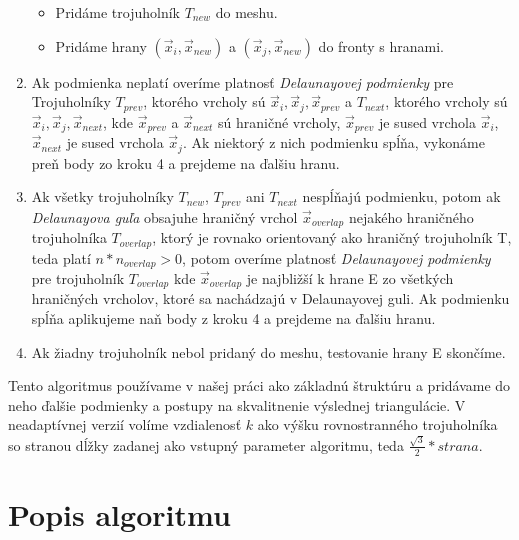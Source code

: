 \begin{enumerate}
{\begin{itemize}
        \item{Pridáme trojuholník $T_{new}$ do meshu.}
        \item{Pridáme hrany $(\overrightarrow{x}_i, \overrightarrow{x}_{new})$ a 
        $(\overrightarrow{x}_j, \overrightarrow{x}_{new})$ do fronty s hranami.}
    \end{itemize}
    }
    \item{
        Ak podmienka neplatí overíme platnosť \textit{Delaunayovej podmienky} pre Trojuholníky 
        $T_{prev}$, ktorého vrcholy sú $\overrightarrow{x}_i, \overrightarrow{x}_j, 
        \overrightarrow{x}_{prev}$ a $T_{next}$, ktorého vrcholy sú 
        $\overrightarrow{x}_i, \overrightarrow{x}_j, \overrightarrow{x}_{next}$, kde 
        $\overrightarrow{x}_{prev}$ a $\overrightarrow{x}_{next}$ sú hraničné vrcholy, 
        $\overrightarrow{x}_{prev}$ 
        je sused vrchola $\overrightarrow{x}_i$, $\overrightarrow{x}_{next}$ je sused vrchola 
        $\overrightarrow{x}_j$. Ak niektorý z nich podmienku
        spĺňa, vykonáme preň body zo kroku 4 a prejdeme na ďalšiu hranu.
    }
    \item{
        Ak všetky trojuholníky $T_{new}$, $T_{prev}$ ani $T_{next}$ nespĺňajú podmienku, potom 
        ak \textit{Delaunayova guľa} obsajuhe hraničný vrchol $\overrightarrow{x}_{overlap}$ nejakého hraničného 
        trojuholníka $T_{overlap}$, ktorý je rovnako orientovaný ako hraničný trojuholník T, teda
        platí $n*n_{overlap} > 0$, potom overíme platnosť \textit{Delaunayovej podmienky} pre 
        trojuholník $T_{overlap}$ kde $\overrightarrow{x}_{overlap}$ je najbližší k hrane E zo všetkých hraničných
        vrcholov, ktoré sa nachádzajú v Delaunayovej guli. Ak podmienku spĺňa aplikujeme naň body z 
        kroku 4 a prejdeme na ďalšiu hranu.
    }
    \item{
        Ak žiadny trojuholník nebol pridaný do meshu, testovanie hrany E skončíme.
    }
\end{enumerate}

Tento algoritmus používame v našej práci ako základnú štruktúru a pridávame do neho ďalšie podmienky 
a postupy na skvalitnenie výslednej triangulácie. V neadaptívnej verzií volíme vzdialenosť $k$ ako 
výšku rovnostranného trojuholníka so stranou dĺžky zadanej ako vstupný parameter algoritmu, teda 
$\frac{\sqrt{3}}{2}*strana$.

\section{Popis algoritmu}



